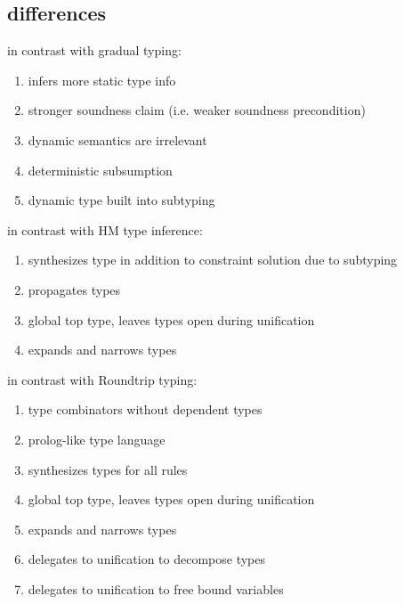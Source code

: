 \documentclass[sigplan,screen]{acmart}
\begin{document}
\subsection*{differences}
in contrast with gradual typing:  
\begin{enumerate}
  \item infers more static type info 
  \item stronger soundness claim (i.e. weaker soundness precondition)
  \item dynamic semantics are irrelevant 
  \item deterministic subsumption 
  \item dynamic type built into subtyping 
\end{enumerate}

in contrast with HM type inference:  
\begin{enumerate}
  \item synthesizes type in addition to constraint solution 
    due to subtyping
  \item propagates types
  \item global top type, leaves types open during unification
  \item expands and narrows types  
\end{enumerate}

in contrast with Roundtrip typing:  
\begin{enumerate}
  \item type combinators without dependent types
  \item prolog-like type language  
  \item synthesizes types for all rules
  \item global top type, leaves types open during unification
  \item expands and narrows types  
  \item delegates to unification to decompose types 
  \item delegates to unification to free bound variables 
\end{enumerate}
\end{document}
